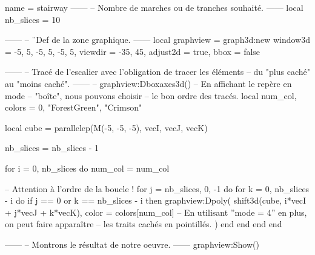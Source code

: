 \documentclass[border = 3pt]{standalone}
\begin{document}
\begin{luadraw*}{name = stairway}
------
-- Nombre de marches ou de tranches souhaité.
------
local nb_slices = 10

------
-- ¨Def de la zone graphique.
------
local graphview = graph3d:new{
  window3d = {-5, 5, -5, 5, -5, 5},
  viewdir  = {-35, 45},
  adjust2d = true,
  bbox     = false
}

------
-- Tracé de l'escalier avec l'obligation de tracer les éléments
-- du "plus caché" au "moins caché".
------
-- graphview:Dboxaxes3d()  -- En affichant le repère en mode
                        -- "boîte", nous pouvons choisir
                        -- le bon ordre des tracés.
local num_col, colors = 0, {"ForestGreen", "Crimson"}

local cube = parallelep(M(-5, -5, -5), vecI, vecJ, vecK)

nb_slices = nb_slices - 1

for i = 0, nb_slices do
  num_col = num_col%

-- Attention à l'ordre de la boucle !
  for j = nb_slices, 0, -1 do
    for k = 0, nb_slices - i do
      if j == 0 or k == nb_slices - i then
        graphview:Dpoly(
          shift3d(cube, i*vecI + j*vecJ + k*vecK),
          {
            color = colors[num_col]
-- En utilisant ''mode = 4'' en plus, on peut faire apparaître
-- les traits cachés en pointillés.
          }
        )
      end
    end
  end
end

------
-- Montrons le résultat de notre oeuvre.
------
graphview:Show()
\end{luadraw*}
\end{document}
